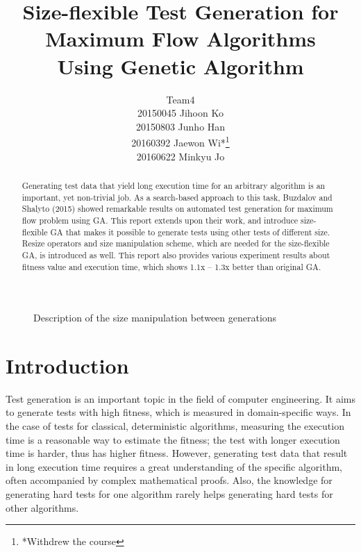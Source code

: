 \documentclass[a4paper, 10pt, conference]{ieeeconf}      %
\title{\LARGE \bf
Size-flexible Test Generation for Maximum Flow Algorithms\\
Using Genetic Algorithm
}
\author{Team4\\
20150045 Jihoon Ko\\
20150803 Junho Han\\
20160392 Jaewon Wi*\thanks{*Withdrew the course}\\
20160622 Minkyu Jo\\}
\begin{document}
\maketitle
\thispagestyle{empty}
\pagestyle{empty}

\begin{figure*}
  \caption{Description of the size manipulation between generations}
  \label{fig:sizeManipulation}
\end{figure*}


\begin{abstract}
Generating test data that yield long execution time for an arbitrary algorithm is an important, yet non-trivial job. As a search-based approach to this task, Buzdalov and Shalyto (2015) \cite{c1} showed remarkable results on automated test generation for maximum flow problem using GA. This report extends upon their work, and introduce size-flexible GA that makes it possible to generate tests using other tests of different size. Resize operators and size manipulation scheme, which are needed for the size-flexible GA, is introduced as well. This report also provides various experiment results about fitness value and execution time, which shows 1.1x -- 1.3x better than original GA.

\end{abstract}


\section{Introduction}

Test generation is an important topic in the field of computer engineering. It aims to generate tests with high fitness, which is measured in domain-specific ways. In the case of tests for classical, deterministic algorithms, measuring the execution time is a reasonable way to estimate the fitness; the test with longer execution time is harder, thus has higher fitness. However, generating test data that result in long execution time requires a great understanding of the specific algorithm, often accompanied by complex mathematical proofs. Also, the knowledge for generating hard tests for one algorithm rarely helps generating hard tests for other algorithms.
\end{document}
